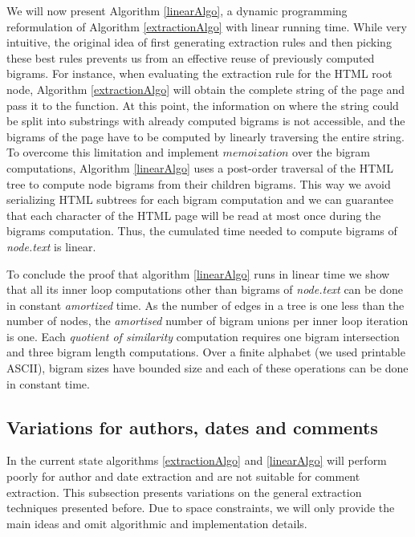 We will now present Algorithm \ref{linearAlgo}, a dynamic programming reformulation of Algorithm \ref{extractionAlgo} with linear running time. While very intuitive, the original idea of first generating extraction rules and then picking these best rules prevents us from an effective reuse of previously computed bigrams. For instance, when evaluating the extraction rule for the HTML root node, Algorithm \ref{extractionAlgo} will obtain the complete string of the page and pass it to the  function. At this point, the information on where the string could be split into substrings with already computed bigrams is not accessible, and the bigrams of the page have to be computed by linearly traversing the entire string. To overcome this limitation and implement $memoization$ over the bigram computations, Algorithm \ref{linearAlgo} uses a post-order traversal of the HTML tree to compute node bigrams from their children bigrams. This way we avoid serializing HTML subtrees for each bigram computation and we can guarantee that each character of the HTML page will be read at most once during the bigrams computation. Thus, the cumulated time needed to compute bigrams of \emph{node.text} is linear.

\linearAlgo

To conclude the proof that algorithm \ref{linearAlgo} runs in linear time we show that all its inner loop computations other than bigrams of \emph{node.text} can be done in constant \emph{amortized} time. As the number of edges in a tree is one less than the number of nodes, the \emph{amortised} number of bigram unions per inner loop iteration is one. Each \emph{quotient of similarity} computation requires one bigram intersection and three bigram length computations. Over a finite alphabet (we used printable ASCII), bigram sizes have bounded size and each of these operations can be done in constant time.

\subsection{Variations for authors, dates and comments}
In the current state algorithms \ref{extractionAlgo} and \ref{linearAlgo} will perform poorly for author and date extraction and are not suitable for comment extraction. This subsection presents variations on the general extraction techniques presented before. Due to space constraints, we will only provide the main ideas and omit algorithmic and implementation details.

